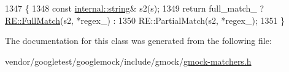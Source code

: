 \begin{DoxyCode}
1347                                                      \{
1348     \textcolor{keyword}{const} \hyperlink{namespacetesting_1_1internal_a8e8ff5b11e64078831112677156cb111}{internal::string}& s2(s);
1349     \textcolor{keywordflow}{return} full\_match\_ ? \hyperlink{classtesting_1_1internal_1_1RE_aa79a950758d0f1d62f7762d1e9cefe86}{RE::FullMatch}(s2, *regex\_) :
1350         RE::PartialMatch(s2, *regex\_);
1351   \}
\end{DoxyCode}


The documentation for this class was generated from the following file\+:\begin{DoxyCompactItemize}
\item 
vendor/googletest/googlemock/include/gmock/\hyperlink{gmock-matchers_8h}{gmock-\/matchers.\+h}\end{DoxyCompactItemize}
